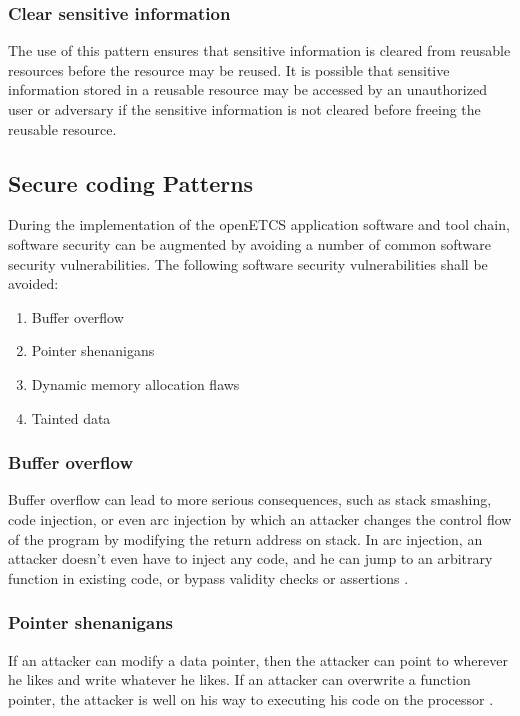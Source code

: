 \documentclass{template/openetcs_report}
\begin{document}
\subsubsection{Clear sensitive information}
The use of this pattern ensures that sensitive information is cleared from reusable resources before the resource may be reused. It is possible that sensitive information stored in a reusable resource may be accessed by an unauthorized user or adversary if the sensitive information is not cleared before freeing the reusable resource.


\subsection{Secure coding Patterns}
\label{CPatterns}
During the implementation of the openETCS application software and tool chain, software security can be augmented by avoiding a number of common software security vulnerabilities. 
The following software security vulnerabilities shall be avoided:
\begin{enumerate}
  \item Buffer overflow
  \item Pointer shenanigans
  \item Dynamic memory allocation flaws
  \item Tainted data
\end{enumerate}

\subsubsection{Buffer overflow}
Buffer overflow can lead to more serious consequences, such as stack smashing, code injection, or even arc injection by which an attacker changes the control flow of the program by modifying the return address on stack. In arc injection, an attacker doesn't even have to inject any code, and he can jump to an arbitrary function in existing code, or bypass validity checks or assertions \cite{Kalinsky09}.

\subsubsection{Pointer shenanigans}
If an attacker can modify a data pointer, then the attacker can point to wherever he likes and write whatever he likes. If an attacker can overwrite a function pointer, the attacker is well on his way to executing his code on the processor \cite{Kalinsky09}.
\end{document}
